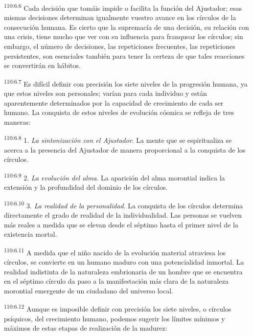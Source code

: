 \documentclass[twoside, 11pt]{book}
\begin{document}
\par
\textsuperscript{110:6.6} Cada decisión que tomáis impide o facilita la función del Ajustador; esas mismas decisiones determinan igualmente vuestro avance en los círculos de la consecución humana. Es cierto que la supremacía de una decisión, su relación con una crisis, tiene mucho que ver con su influencia para franquear los círculos; sin embargo, el número de decisiones, las repeticiones frecuentes, las repeticiones persistentes, son esenciales también para tener la certeza de que tales reacciones se convertirán en hábitos.

\par
\textsuperscript{110:6.7} Es difícil definir con precisión los siete niveles de la progresión humana, ya que estos niveles son personales; varían para cada individuo y están aparentemente determinados por la capacidad de crecimiento de cada ser humano. La conquista de estos niveles de evolución cósmica se refleja de tres maneras:

\par
\textsuperscript{110:6.8} 1. \textit{La sintonización con el Ajustador}. La mente que se espiritualiza se acerca a la presencia del Ajustador de manera proporcional a la conquista de los círculos.

\par
\textsuperscript{110:6.9} 2. \textit{La evolución del alma}. La aparición del alma morontial indica la extensión y la profundidad del dominio de los círculos.

\par
\textsuperscript{110:6.10} 3. \textit{La realidad de la personalidad}. La conquista de los círculos determina directamente el grado de realidad de la individualidad. Las personas se vuelven más reales a medida que se elevan desde el séptimo hasta el primer nivel de la existencia mortal.

\par
\textsuperscript{110:6.11} A medida que el niño nacido de la evolución material atraviesa los círculos, se convierte en un humano maduro con una potencialidad inmortal. La realidad indistinta de la naturaleza embrionaria de un hombre que se encuentra en el séptimo círculo da paso a la manifestación más clara de la naturaleza morontial emergente de un ciudadano del universo local.

\par
\textsuperscript{110:6.12} Aunque es imposible definir con precisión los siete niveles, o círculos psíquicos, del crecimiento humano, podemos sugerir los límites mínimos y máximos de estas etapas de realización de la madurez:
\end{document}

